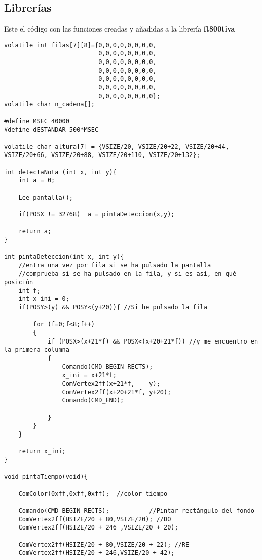 \documentclass[12pt,a4paper]{article}
\begin{document}
\subsection{Librerías}
Este el código con las funciones creadas y añadidas a la librería \textbf{ft800tiva}

\begin{lstlisting}[basicstyle=\footnotesize]
volatile int filas[7][8]={0,0,0,0,0,0,0,0,
                          0,0,0,0,0,0,0,0,
                          0,0,0,0,0,0,0,0,
                          0,0,0,0,0,0,0,0,
                          0,0,0,0,0,0,0,0,
                          0,0,0,0,0,0,0,0,
                          0,0,0,0,0,0,0,0};
volatile char n_cadena[];

#define MSEC 40000
#define dESTANDAR 500*MSEC

volatile char altura[7] = {VSIZE/20, VSIZE/20+22, VSIZE/20+44, VSIZE/20+66, VSIZE/20+88, VSIZE/20+110, VSIZE/20+132};

int detectaNota (int x, int y){
    int a = 0;

    Lee_pantalla();

    if(POSX != 32768)  a = pintaDeteccion(x,y);

    return a;
}

int pintaDeteccion(int x, int y){
    //entra una vez por fila si se ha pulsado la pantalla
    //comprueba si se ha pulsado en la fila, y si es así, en qué posición
    int f;
    int x_ini = 0;
    if(POSY>(y) && POSY<(y+20)){ //Si he pulsado la fila

        for (f=0;f<8;f++)
        {
            if (POSX>(x+21*f) && POSX<(x+20+21*f)) //y me encuentro en la primera columna
            {
                Comando(CMD_BEGIN_RECTS);
                x_ini = x+21*f;
                ComVertex2ff(x+21*f,    y);
                ComVertex2ff(x+20+21*f, y+20);
                Comando(CMD_END);

            }
        }
    }

    return x_ini;
}

void pintaTiempo(void){

    ComColor(0xff,0xff,0xff);  //color tiempo

    Comando(CMD_BEGIN_RECTS);           //Pintar rectángulo del fondo
    ComVertex2ff(HSIZE/20 + 80,VSIZE/20); //DO
    ComVertex2ff(HSIZE/20 + 246 ,VSIZE/20 + 20);

    ComVertex2ff(HSIZE/20 + 80,VSIZE/20 + 22); //RE
    ComVertex2ff(HSIZE/20 + 246,VSIZE/20 + 42);


\end{lstlisting}
\end{document}
